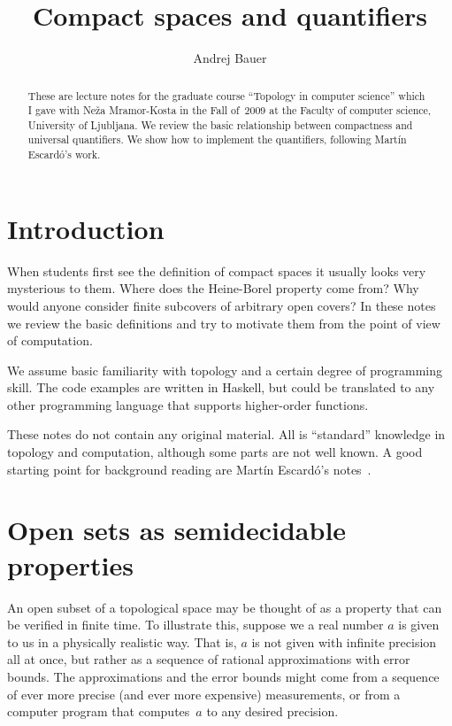 \documentclass[a4paper,10pt]{article}
\begin{document}
\title{Compact spaces and quantifiers}
\author{Andrej Bauer}

\maketitle

\begin{abstract}
  These are lecture notes for the graduate course ``Topology in
  computer science'' which I gave with Neža Mramor-Kosta in the Fall
  of~2009 at the Faculty of computer science, University of Ljubljana.
  We review the basic relationship between compactness and universal
  quantifiers. We show how to implement the quantifiers, following
  Martín Escardó's work.
\end{abstract}

\section{Introduction}
\label{sec:introduction}

When students first see the definition of compact spaces it usually
looks very mysterious to them. Where does the Heine-Borel property
come from? Why would anyone consider finite subcovers of arbitrary
open covers? In these notes we review the basic definitions and try to
motivate them from the point of view of computation.

We assume basic familiarity with topology and a certain degree of
programming skill. The code examples are written in Haskell, but could
be translated to any other programming language that supports
higher-order functions.

These notes do not contain any original material. All is ``standard''
knowledge in topology and computation, although some parts are not
well known. A good starting point for background reading are Martín
Escardó's notes~\cite{escardo}.

\section{Open sets as semidecidable properties}
\label{sec:opens-semidecidable}

An open subset of a topological space may be thought of as a property
that can be verified in finite time. To illustrate this, suppose we a
real number $a$ is given to us in a physically realistic way. That is,
$a$ is not given with infinite precision all at once, but rather as a
sequence of rational approximations with error bounds. The
approximations and the error bounds might come from a sequence of ever
more precise (and ever more expensive) measurements, or from a
computer program that computes~$a$ to any desired precision.
\end{document}
